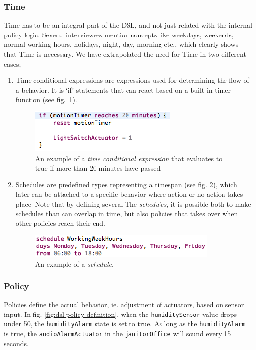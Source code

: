 \subsubsection{Time}\label{subsec:time}
Time has to be an integral part of the DSL, and not just related with the internal policy logic. Several interviewees mention concepts like weekdays, weekends, normal working hours, holidays, night, day, morning etc., which clearly shows that Time is necessary. We have extrapolated the need for Time in two different cases;
\begin{enumerate}
	\item Time conditional expressions\label{subsubsec:conditionalexpression}
are expressions used for determining the flow of a behavior. It is `if' statements that can react based on a built-in timer function (see fig.~\ref{fig:dsl-conditionalexpression}).

\begin{figure}[h]
  \centering
    \includegraphics[scale=.5]{dsl-conditional-time-expression.png}
	\caption{An example of a \textit{time conditional expression} that evaluates to true if more than 20 minutes have passed.}
	\label{fig:dsl-conditionalexpression}
\end{figure}
\newpage
\item Schedules\label{subsubsec:schedules} are predefined types representing a timespan (see fig. \ref{fig:dsl-schedules}), which later can be attached to a specific behavior where action or no-action takes place. Note that by defining several The \textit{schedules}, it is possible both to make schedules than can overlap in time, but also policies that takes over when other policies reach their end.

\begin{figure}
  \centering
  \includegraphics[scale=.5]{dsl-schedules.png}
  \caption{An example of a \textit{schedule}.}
  \label{fig:dsl-schedules}
\end{figure}
\end{enumerate}

\subsubsection{Policy}\label{subsec:policies}
Policies define the actual behavior, ie. adjustment of actuators, based on sensor input. In fig. \ref{fig:dsl-policy-definition}, when the \texttt{humiditySensor} value drops under 50, the \texttt{humidityAlarm} state is set to true. As long as the \texttt{humidityAlarm} is true, the \texttt{audioAlarmActuator} in the \texttt{janitorOffice} will sound every 15 seconds.

